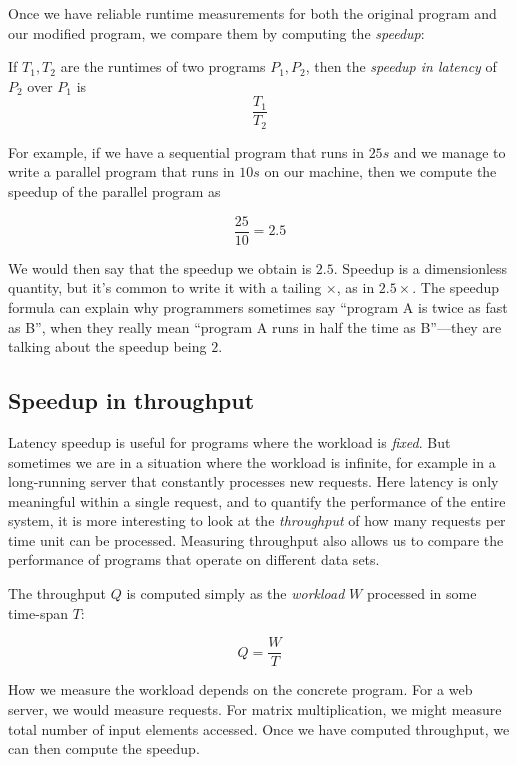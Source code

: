 Once we have reliable runtime measurements for both the original
program and our modified program, we compare them by computing the
\emph{speedup}:

\begin{definition}\label{speedup-latency}

  If $T_{1}, T_{2}$ are the runtimes of two programs $P_{1}, P_{2}$,
  then the \emph{speedup in latency} of $P_{2}$ over $P_{1}$ is
  \[
    \frac{T_{1}}{T_{2}}
  \]
\end{definition}

For example, if we have a sequential program that runs in $25s$ and we
manage to write a parallel program that runs in $10s$ on our machine,
then we compute the speedup of the parallel program as

\[
  \frac{25}{10} = 2.5
\]

We would then say that the speedup we obtain is $2.5$.  Speedup is a
dimensionless quantity, but it's common to write it with a tailing
$\times$, as in $2.5\times$.  The speedup formula can explain why
programmers sometimes say ``program A is twice as fast as B'', when
they really mean ``program A runs in half the time as B''---they are
talking about the speedup being $2$.

\subsection{Speedup in throughput}

Latency speedup is useful for programs where the workload is
\emph{fixed}.  But sometimes we are in a situation where the workload
is infinite, for example in a long-running server that constantly
processes new requests.  Here latency is only meaningful within a
single request, and to quantify the performance of the entire system,
it is more interesting to look at the \emph{throughput} of how many
requests per time unit can be processed.  Measuring throughput also
allows us to compare the performance of programs that operate on
different data sets.

The throughput $Q$ is computed simply as the \emph{workload} $W$
processed in some time-span $T$:

\[
  Q = \frac{W}{T}
\]

How we measure the workload depends on the concrete program.  For a
web server, we would measure requests.  For matrix multiplication, we
might measure total number of input elements accessed.  Once we have
computed throughput, we can then compute the speedup.

